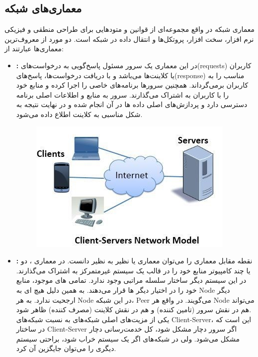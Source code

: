 \documentclass[]{article}
\begin{document}
\subsection*{{\titr معماری‌های شبکه}}
معماری شبکه در واقع مجموعه‌ای از قوانین و متودهایی برای طراحی منطقی و فیزیکی نرم افزار، سخت افزار، پروتکل‌ها و انتقال داده در شبکه است. دو مورد از معروف‌ترین معماری‌ها عبارتند از:

\begin{itemize}
	\item \textbf{:} در این معماری یک سرور مسئول پاسخ‌گویی به درخواست‌های(requests) کاربران یا کلاینت‌ها می‌باشد و با دریافت درخواست‌ها، پاسخ‌های(response) مناسب را به کاربران برمی‌گرداند. همچنین سرورها برنامه‌های خاصی را اجرا کرده و منابع خود را با کاربران به اشتراک می‌گذارند.	 سرور به منابع و اطلاعات اصلی برنامه دسترسی دارد و پردازش‌های اصلی داده ها در آن انجام شده و در نهایت نتیجه به شکل مناسبی به کلاینت اطلاع داده می‌شود.
	\begin{figure}[H]
		\centerline{\includegraphics[scale=0.8]{resources/ClientServer.jpg}}
	\end{figure}
	\item \textbf{:} نقطه مقابل معماری  را می‌توان معماری  یا نظیر به نظیر دانست. در معماری ، دو یا چند کامپیوتر منابع خود را در قالب یک سیستم غیرمتمرکز به اشتراک می‌گذارند. در این سیستم دیگر ساختار سلسله مراتبی وجود ندارد. تمامی های موجود، منابع خود را در اختیار دیگر ها قرار می‌دهند. به همین دلیل هیچ ای به Node دیگر ارجحیت ندارد. به هر Node در این شبکه، Peer می‌گویند. در واقع هر Node می‌تواند هم در نقش سرور (تامین کننده) و هم در نقش کلاینت (مصرف کننده) ظاهر شود.\\
	یکی از مزیت‌های اصلی شبکه‌های  به نسبت شبکه‌های Client-Server، این است که در ساختار Client-Server اگر سرور دچار مشکل شود، کل خدمت‌رسانی دچار مشکل می‌شود. ولی در شبکه‌های  اگر یک سیستم خراب شود، براحتی سیستم دیگری را می‌توان جایگزین آن کرد.\\

\end{itemize}
\end{document}
